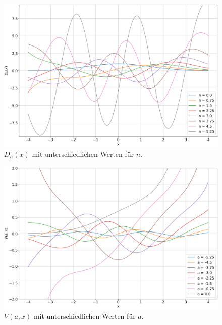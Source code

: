 \begin{figure}
    \centering
    \includegraphics[scale=0.35]{papers/parzyl/img/D_plot.png}
    \caption{$D_n(x)$ mit unterschiedlichen Werten für $n$.}
    \label{parzyl:fig:dnz}
\end{figure}
\begin{figure}
    \centering
    \includegraphics[scale=0.35]{papers/parzyl/img/v_plot.png}
    \caption{$V(a,x)$ mit unterschiedlichen Werten für $a$.}
    \label{parzyl:fig:Vnz}
\end{figure}